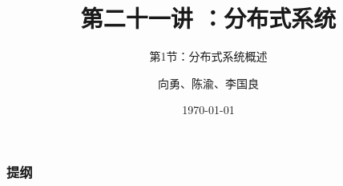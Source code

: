 


\title[第21讲]{第二十一讲 ：分布式系统} %
\subtitle{第1节：分布式系统概述}
\author{向勇、陈渝、李国良} %
\date{\today} %


    
    \begin{frame}
        \titlepage %
    \end{frame}
    
    \begin{frame}
        \frametitle{提纲} %
        \tableofcontents %
        
        
    \end{frame}
